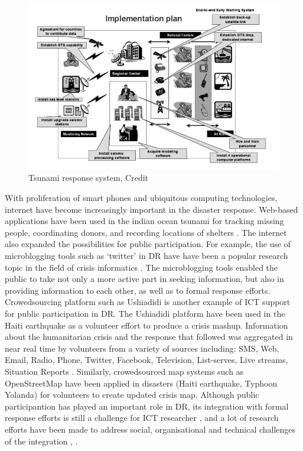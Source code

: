 \begin{figure}[h]
  \centering
  \includegraphics[width=1\textwidth]{img/background/ICTExample}
  \caption{Tsunami response system, Credit \cite{Wattegama2012} }
  \label{fig:ICTExample}
\end{figure}

With proliferation of smart phones and ubiquitous computing technologies, internet have become increasingly important in the disaster response. Web-based applications have been used in the indian ocean tsunami for tracking missing people, coordinating donors, and recording locations of shelters \cite{Wattegama2012}. The internet also expanded the possibilities for public participation. For example, the use of microblogging tools such as `twitter' in \ac{DR} have have been a popular research topic in the field of crisis informatics \cite{Kogan2012,Sarcevic2012,Starbird2010}.  The microblogging tools enabled the public to take not only a more active part in seeking information, but also in providing information to each other, as well as to formal response efforts. Crowedsourcing platform such as Ushiadidi \cite{Morrow2011} is another example of \ac{ICT} support for public participation in \ac{DR}. The Ushiadidi platform have been used in the Haiti earthquake as a volunteer effort to produce a crisis mashup. Information about the humanitarian crisis and the response that followed was aggregated in near real time by volunteers from a variety of sources including: SMS, Web, Email, Radio, Phone, Twitter, Facebook, Television, List-serves, Live streams, Situation Reports \cite{Morrow2011}. Similarly, crowedsourced map systems such as OpenStreetMap \cite{Palen2015} have been applied in disasters (Haiti earthquake, Typhoon Yolanda) for volunteers to create updated crisis map. Although public participantion has played an important role in \ac{DR}, its integration with formal response efforts is still a challenge for \ac{ICT} researcher \cite{Palen2007}, and a lot of research efforts have been made to address social, organisational and technical challenges of the integration \cite{Dashti2014}, \cite{Sutton2008}.   \\

